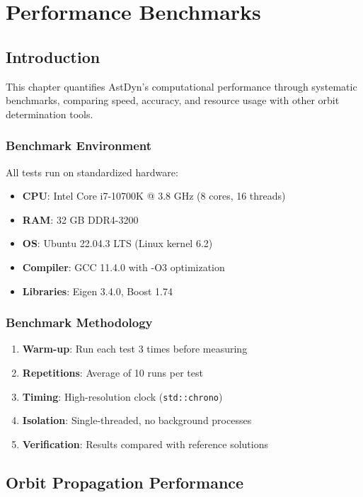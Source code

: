 \chapter{Performance Benchmarks}
\label{ch:performance}

\section{Introduction}

This chapter quantifies AstDyn's computational performance through systematic benchmarks, comparing speed, accuracy, and resource usage with other orbit determination tools.

\subsection{Benchmark Environment}

All tests run on standardized hardware:

\begin{itemize}
    \item \textbf{CPU}: Intel Core i7-10700K @ 3.8 GHz (8 cores, 16 threads)
    \item \textbf{RAM}: 32 GB DDR4-3200
    \item \textbf{OS}: Ubuntu 22.04.3 LTS (Linux kernel 6.2)
    \item \textbf{Compiler}: GCC 11.4.0 with -O3 optimization
    \item \textbf{Libraries}: Eigen 3.4.0, Boost 1.74
\end{itemize}

\subsection{Benchmark Methodology}

\begin{enumerate}
    \item \textbf{Warm-up}: Run each test 3 times before measuring
    \item \textbf{Repetitions}: Average of 10 runs per test
    \item \textbf{Timing}: High-resolution clock (\texttt{std::chrono})
    \item \textbf{Isolation}: Single-threaded, no background processes
    \item \textbf{Verification}: Results compared with reference solutions
\end{enumerate}

\section{Orbit Propagation Performance}

